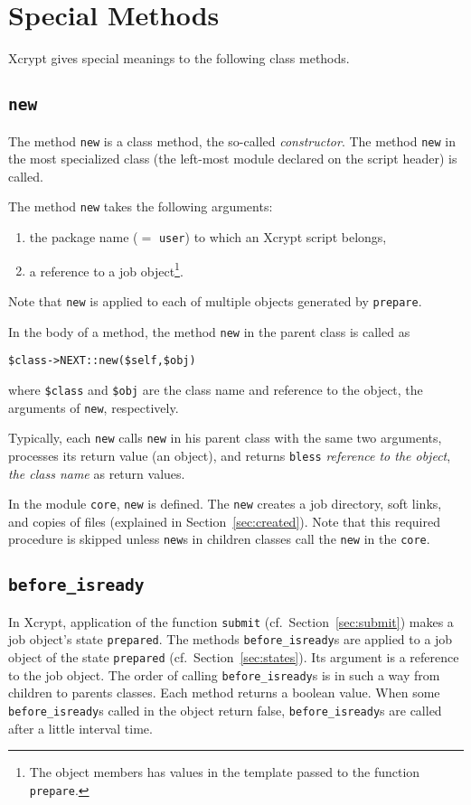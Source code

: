 \documentclass[a4paper,10pt]{report}
\def\|{\verb|} %|
\begin{document}
\section{Special Methods}

Xcrypt gives special meanings to the following class methods.

\subsection{\texttt{new}}

The method \texttt{new} is a class method, the so-called
\textit{constructor}.  The method \|new| in the most specialized class
(the left-most module declared on the script header) is called.

The method \|new| takes the following arguments:
\begin{enumerate}
\item the package name ($=$ \|user|) to which an Xcrypt script belongs,
\item a reference to a job object\footnote{The object members has
      values in the template passed to the function \texttt{prepare}.}.
\end{enumerate}
Note that \|new| is applied to each of multiple objects
generated by \|prepare|.

In the body of a method, the method \|new| in the parent class is
called as
\begin{center}
 \|$class->NEXT::new($self,$obj)|
\end{center}
where \|$class| and \|$obj| are the class name and reference to the
object, the arguments of \|new|, respectively.

Typically, each \|new| calls \|new| in his parent class with the same
two arguments, processes its return value (an object), and returns
\|bless| \textit{reference to the object},
\textit{the class name} as return values.

In the module \|core|, \|new| is defined.  The \|new| creates a job
directory, soft links, and copies of files (explained in
Section~\ref{sec:created}).  Note that this required procedure is
skipped unless \|new|s in children classes call the \|new| in the
\|core|.

\subsection{\texttt{before\_isready}}

In Xcrypt, application of the function \|submit| (cf.\
Section~\ref{sec:submit}) makes a job object's state \|prepared|.  The
methods \texttt{before\_isready}s are applied to a job object of the
state \|prepared| (cf.\ Section~\ref{sec:states}).  Its argument is a
reference to the job object.  The order of calling
\texttt{before\_isready}s is in such a way from children to parents
classes.  Each method returns a boolean value.  When some
\texttt{before\_isready}s called in the object return false,
\texttt{before\_isready}s are called after a little interval time.
\end{document}
